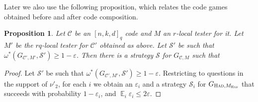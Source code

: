 \documentclass[11pt]{article}
\newtheorem{proposition}[theorem]{Proposition}
\theoremstyle{definition}
\newcommand{\code}{\mathscr{C}}
\newcommand{\strategy}{\mathscr{S}}
\DeclareMathOperator*{\Expectation}{\mathbb{E}}
\newcommand{\Es}[1]{\Expectation_{#1}}
\newcommand{\had}{\textsc{Had}}
\newcommand{\eps}{\varepsilon}
\begin{document}
Later we also use the following proposition, which relates the code games obtained before and after code composition. 


\begin{proposition}\label{prop:q-to-2}
Let $\code$ be an $[n,k,d]_q$ code and $M$ an $r$-local tester for it. Let $M'$ be the $rq$-local tester for $\code'$ obtained as above. Let $\strategy'$ be such that $\omega^*(G_{\code',M'},\strategy')\geq 1-\eps$. Then there is a strategy $\strategy$ for $G_{\code,M}$ such that  
\end{proposition}

\begin{proof}
Let $\strategy'$ be such that $\omega^*(G_{\code',M'},\strategy')\geq 1-\eps$. Restricting to questions in the support of $\nu'_2$, for each $i$ we obtain an $\eps_i$ and a strategy $\strategy_i$ for $G_{\had,M_\had}$ that succeeds with probability $1-\eps_i$, and $\Es{i} \eps_i \leq 2\eps$. 


\end{proof}
\end{document}
